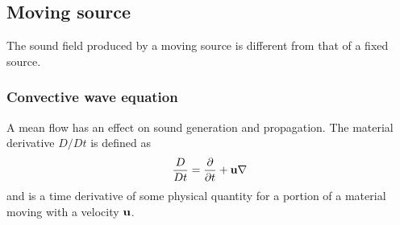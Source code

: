 %
%
%
%
%
%
%
%
%
%
%


\subsection{Moving source}
The sound field produced by a moving source is different from that of a fixed source.

\subsubsection*{Convective wave equation}
A mean flow has an effect on sound generation and propagation.
The material derivative $D/Dt$ is defined as
\begin{equation}
  \frac{D}{Dt} = \frac{\partial}{\partial t} + \mathbf{u} \nabla
\end{equation}
and is a time derivative of some physical quantity for a portion of a material
moving with a velocity $\mathbf{u}$.

